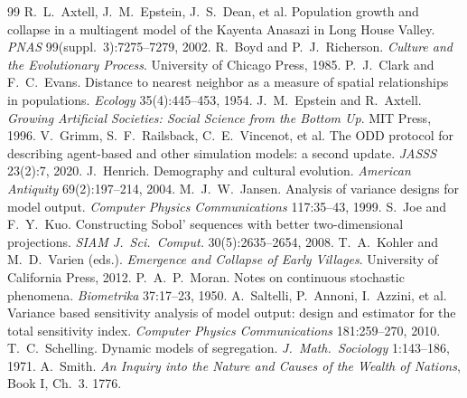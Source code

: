 \documentclass[11pt]{article}
\theoremstyle{definition}
\newcommand{\1}{\mathbf{1}}
\begin{document}
\begin{thebibliography}{99}\small
{} R.~L.~Axtell, J.~M.~Epstein, J.~S.~Dean, et al. Population growth and collapse in a multiagent model of the Kayenta Anasazi in Long House Valley. \emph{PNAS} 99(suppl.~3):7275--7279, 2002.
 R.~Boyd and P.~J.~Richerson. \emph{Culture and the Evolutionary Process}. University of Chicago Press, 1985.
 P.~J.~Clark and F.~C.~Evans. Distance to nearest neighbor as a measure of spatial relationships in populations. \emph{Ecology} 35(4):445--453, 1954.
 J.~M.~Epstein and R.~Axtell. \emph{Growing Artificial Societies: Social Science from the Bottom Up}. MIT Press, 1996.
 V.~Grimm, S.~F.~Railsback, C.~E.~Vincenot, et al. The ODD protocol for describing agent-based and other simulation models: a second update. \emph{JASSS} 23(2):7, 2020.
 J.~Henrich. Demography and cultural evolution. \emph{American Antiquity} 69(2):197--214, 2004.
 M.~J.~W.~Jansen. Analysis of variance designs for model output. \emph{Computer Physics Communications} 117:35--43, 1999.
 S.~Joe and F.~Y.~Kuo. Constructing Sobol' sequences with better two-dimensional projections. \emph{SIAM J.\ Sci.\ Comput.} 30(5):2635--2654, 2008.
 T.~A.~Kohler and M.~D.~Varien (eds.). \emph{Emergence and Collapse of Early Villages}. University of California Press, 2012.
 P.~A.~P.~Moran. Notes on continuous stochastic phenomena. \emph{Biometrika} 37:17--23, 1950.
 A.~Saltelli, P.~Annoni, I.~Azzini, et al. Variance based sensitivity analysis of model output: design and estimator for the total sensitivity index. \emph{Computer Physics Communications} 181:259--270, 2010.
 T.~C.~Schelling. Dynamic models of segregation. \emph{J.\ Math.\ Sociology} 1:143--186, 1971.
 A.~Smith. \emph{An Inquiry into the Nature and Causes of the Wealth of Nations}, Book I, Ch.~3. 1776.
\end{thebibliography}
\end{document}

